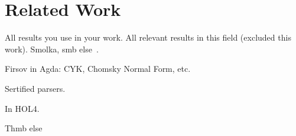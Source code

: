 \section{Related Work}

All results you use in your work.
All relevant results in this field (excluded this work).
Smolka, smb else~\cite{smolka2017regular, smolka2013regular, firsov2016cfl}. 

Firsov in Agda: CYK, Chomsky Normal Form, etc.

Sertified parsers.

In HOL4.

Thmb else





